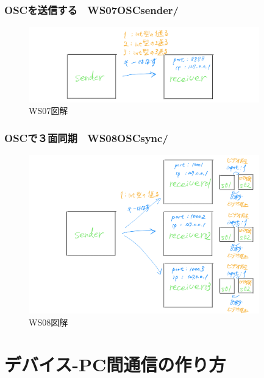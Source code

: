 \documentclass[10pt, dvipdfmx]{beamer}
\begin{document}
        \begin{frame}
            \frametitle{OSCを送信する　WS07OSCsender/}
                \begin{figure}[htb]
                    \includegraphics[width=100mm]{images/ws06-1.png}
                    \caption{WS07図解}
                    \label{fig:04}
                \end{figure}
        \end{frame}

        \begin{frame}
            \frametitle{OSCで３面同期　WS08OSCsync/}
                \begin{figure}[htb]
                    \includegraphics[width=100mm]{images/ws08-1.png}
                    \caption{WS08図解}
                    \label{fig:05}
                \end{figure}
        \end{frame}

    \section{デバイス-PC間通信の作り方}
        \begin{frame}
        \end{frame}
\end{document}
